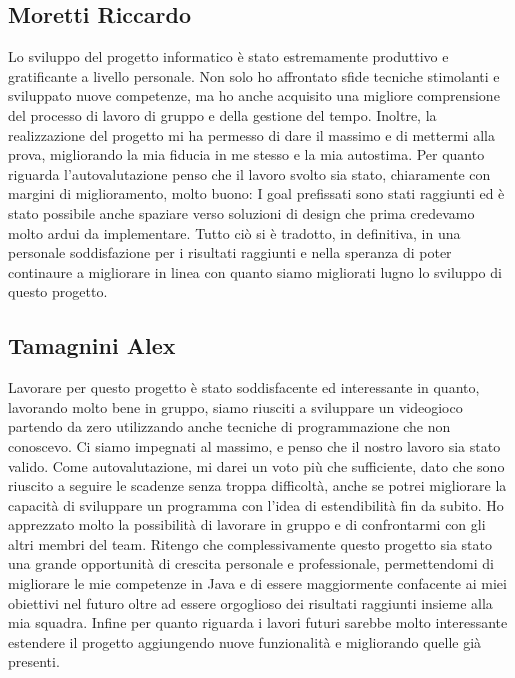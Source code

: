 \documentclass[a4paper,12pt]{report}
\begin{document}
\subsection*{Moretti Riccardo}
Lo sviluppo del progetto informatico è stato estremamente produttivo e gratificante a livello personale. Non solo ho affrontato sfide tecniche stimolanti e sviluppato nuove competenze, ma ho anche acquisito una migliore comprensione del processo di lavoro di gruppo e della gestione del tempo. 
Inoltre, la realizzazione del progetto mi ha permesso di dare il massimo e di mettermi alla prova, migliorando la mia fiducia in me stesso e la mia autostima. 
Per quanto riguarda l'autovalutazione penso che il lavoro svolto sia stato, chiaramente con margini di miglioramento, molto buono: I goal prefissati sono stati raggiunti ed è stato possibile anche spaziare verso soluzioni di design che prima credevamo molto ardui da implementare.
Tutto ciò si è tradotto, in definitiva, in una personale soddisfazione per i risultati raggiunti e nella speranza di poter continaure a migliorare in linea con quanto siamo migliorati lugno lo sviluppo di questo progetto.

\subsection*{Tamagnini Alex}
Lavorare per questo progetto è stato soddisfacente ed interessante in quanto, lavorando molto bene in gruppo, siamo riusciti a sviluppare un videogioco partendo da zero utilizzando anche tecniche di programmazione che non conoscevo. Ci siamo impegnati al massimo, e penso che il nostro lavoro sia stato valido.
Come autovalutazione, mi darei un voto più che sufficiente, dato che sono riuscito a seguire le scadenze senza troppa difficoltà, anche se potrei migliorare la capacità di sviluppare un programma con l'idea di estendibilità fin da subito.
Ho apprezzato molto la possibilità di lavorare in gruppo e di confrontarmi con gli altri membri del team. Ritengo che complessivamente questo progetto sia stato una grande opportunità di crescita personale e professionale, permettendomi di migliorare le mie competenze in Java e di essere maggiormente confacente ai miei obiettivi nel futuro oltre ad essere orgoglioso dei risultati raggiunti insieme alla mia squadra.
Infine per quanto riguarda i lavori futuri sarebbe molto interessante estendere il progetto aggiungendo nuove funzionalità e migliorando quelle già presenti.
\end{document}
